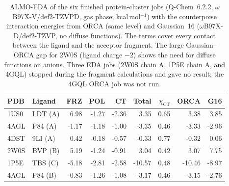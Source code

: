 \begin{table}[!htbp]\centering\small
\caption{ALMO-EDA of the six finished protein-cluster jobs (Q-Chem~6.2.2, $\omega$B97X-V/def2-TZVPD, gas phase; kcal\,mol$^{-1}$) with the counterpoise interaction energies from ORCA (same level) and Gaussian~16 ($\omega$B97X-D/def2-TZVP, no diffuse functions). The terms cover every contact between the ligand and the acceptor fragment. The large Gaussian--ORCA gap for 2W0S (ligand charge $-2$) shows the need for diffuse functions on anions. Three EDA jobs (2W0S chain A, 1P5E chain A, and 4GQL) stopped during the fragment calculations and gave no result; the 4GQL ORCA job was not run.}\label{tab:proteda}
\begin{tabular}{llrrrrrrr}\toprule PDB & Ligand & FRZ & POL & CT & Total & $\chi_\mathrm{CT}$ & ORCA & G16\\\midrule
1US0 & LDT (A) & 6.98 & -1.27 & -2.36 & 3.35 & 0.65 & 3.38 & 3.85\\
4AGL & P84 (A) & -1.17 & -1.18 & -1.00 & -3.35 & 0.46 & -3.33 & -2.96\\
4DST & 9LI (A) & 0.42 & -0.18 & -0.57 & -0.33 & 0.77 & -0.32 & 0.06\\
2W0S & BVP (B) & 5.19 & -1.24 & -0.91 & 3.04 & 0.42 & 3.07 & 7.75\\
1P5E & TBS (C) & -5.18 & -2.81 & -2.58 & -10.57 & 0.48 & -10.46 & -8.97\\
4AGL & P84 (B) & -0.83 & -1.26 & -1.08 & -3.17 & 0.46 & -3.15 & -2.76\\
\bottomrule\end{tabular}\end{table}
